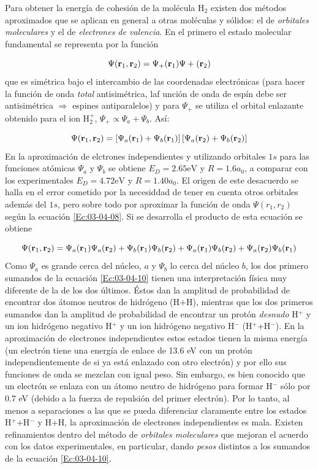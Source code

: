 Para obtener la energía de cohesión de la molécula H$_2$ existen dos métodos aproximados que se aplican en general a otras moléculas y sólidos: el de \textit{orbitales moleculares} y el de \textit{electrones de valencia}. En el primero el estado molecular fundamental se representa por la función 

\begin{equation}
    \Psi (\mathbf{r}_1, \mathbf{r}_2) = \Psi_+ (\mathbf{r}_1) \Psi+ (\mathbf{r}_2)
\end{equation}
que es simétrica bajo el intercambio de las coordenadas electrónicas (para hacer la función de onda \textit{total} antisimétrica, laf unción de onda de espín debe ser antisimétrica $\Rightarrow$ espines antiparalelos) y para $\Psi_+$ se utiliza el orbital enlazante obtenido para el ion H$_2^+$, $\Psi_+ \propto \Psi_a + \Psi_b$. Así:

\begin{equation}
    \Psi (\mathbf{r}_1, \mathbf{r}_2) = \left[ \Psi_a (\mathbf{r}_1)+\Psi_b (\mathbf{r}_1) \right]\left[ \Psi_a(\mathbf{r}_2)+\Psi_b(\mathbf{r}_2) \right] \label{Ec:03-04-08}
\end{equation}
En la aproximación de elctrones independientes y utilizando orbitales $1s$ para las funciones atómicas $\Psi_a$ y $\Psi_b$ se obtiene $E_D = 2.65 \unit{\eV}$ y $R=1.6a_0$, a comparar con los experimentales $E_D = 4.72 \unit{\eV}$ y $R=1.40a_0$. El origen de este desacuerdo se halla en el error cometido por la necesiddad de tener en cuenta otros orbitales además del $1s$, pero sobre todo por aproximar la función de onda $\Psi(r_1,r_2)$ según la ecuación \ref{Ec:03-04-08}. Si se desarrolla el producto de esta ecuación se obtiene 

\begin{equation}
    \Psi (\mathbf{r}_1 , \mathbf{r}_2) = \Psi_a (\mathbf{r}_1) \Psi_a (\mathbf{r}_2) + \Psi_b (\mathbf{r}_1) \Psi_b (\mathbf{r}_2) + \Psi_a (\mathbf{r}_1) \Psi_b (\mathbf{r}_2) + \Psi_a (\mathbf{r}_2) \Psi_b (\mathbf{r}_1) \label{Ec:03-04-10}
\end{equation}
Como $\Psi_a$ es grande cerca del núcleo, $a$ y $\Psi_b$ lo cerca del núcleo $b$, los dos primero sumandos de la ecuación \ref{Ec:03-04-10} tienen una interpretación física muy diferente de la de los dos últimos. Éstos dan la amplitud de probabilidad de encontrar dos átomos neutros de hidrógeno (H+H), mientras que los dos primeros sumandos dan la amplitud de probabilidad de encontrar un protón \textit{desnudo} H$^+$ y un ion hidrógeno negativo H$^+$ y un ion hidrógeno negativo H$^-$ (H$^+$+H$^-$). En la aproximación de electrones independientes estos estados tienen la misma energía (un electrón tiene una energía de enlace de 13.6 eV con un protón independientemente de si ya está enlazado con otro electrón) y por ello sus funciones de onda se mezclan con igual peso. Sin embargo, es bien conocido que un electrón se enlaza con un átomo neutro de hidrógeno para formar H$^-$ sólo por 0.7 eV (debido a la fuerza de repulsión del primer electrón). Por lo tanto, al menos a separaciones a las que se pueda diferenciar claramente entre los estados H$^+$+H$^-$ y H+H, la aproximación de electrones independientes es mala. Existen refinamientos dentro del método de \textit{orbitales moleculares} que mejoran el acuerdo con los datos experimentales, en particular, dando \textit{pesos} distintos a los sumandos de la ecuación \ref{Ec:03-04-10}.  

